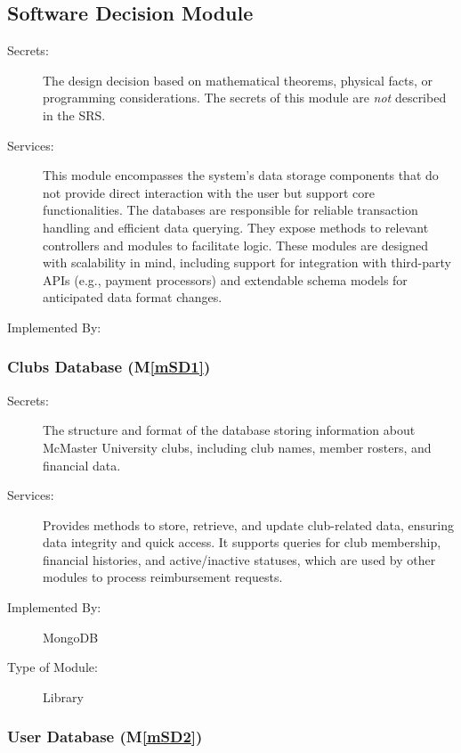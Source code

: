\documentclass[12pt, titlepage]{article}
\newcommand{\mref}[1]{M\ref{#1}}
\begin{document}
\subsection{Software Decision Module}

\begin{description}
\item[Secrets:] The design decision based on mathematical theorems, physical
  facts, or programming considerations. The secrets of this module are
  \emph{not} described in the SRS.
\item[Services:] This module encompasses the system's data storage components that do not provide direct interaction with the user but support core functionalities. The databases are responsible for reliable transaction handling and efficient data querying. They expose methods to relevant controllers and modules to facilitate logic. These modules are designed with scalability in mind, including support for integration with third-party APIs (e.g., payment processors) and extendable schema models for anticipated data format changes. 
\item[Implemented By:]
\end{description}

\subsubsection{Clubs Database (\mref{mSD1})}

\begin{description}
\item[Secrets:] The structure and format of the database storing information about McMaster University clubs, including club names, member rosters, and financial data.
\item[Services:] Provides methods to store, retrieve, and update club-related data, ensuring data integrity and quick access. It supports queries for club membership, financial histories, and active/inactive statuses, which are used by other modules to process reimbursement requests.
\item[Implemented By:] MongoDB
\item[Type of Module:] Library
\end{description}

\subsubsection{User Database (\mref{mSD2})}
\end{document}
